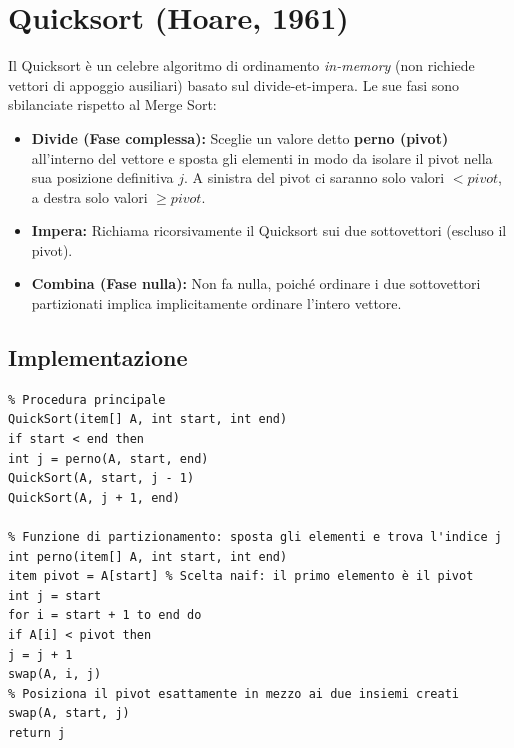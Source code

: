 \documentclass[12pt, a4paper]{article}
\begin{document}
\newpage

\section{Quicksort (Hoare, 1961)}

Il Quicksort è un celebre algoritmo di ordinamento \textit{in-memory} (non richiede vettori di appoggio ausiliari) basato sul divide-et-impera. Le sue fasi sono sbilanciate rispetto al Merge Sort:
\begin{itemize}
\item \textbf{Divide (Fase complessa):} Sceglie un valore detto \textbf{perno (pivot)} all'interno del vettore e sposta gli elementi in modo da isolare il pivot nella sua posizione definitiva $j$. A sinistra del pivot ci saranno solo valori $< pivot$, a destra solo valori $\ge pivot$.
\item \textbf{Impera:} Richiama ricorsivamente il Quicksort sui due sottovettori (escluso il pivot).
\item \textbf{Combina (Fase nulla):} Non fa nulla, poiché ordinare i due sottovettori partizionati implica implicitamente ordinare l'intero vettore.
\end{itemize}

\subsection{Implementazione}
\begin{verbatim}
% Procedura principale
QuickSort(item[] A, int start, int end)
if start < end then
int j = perno(A, start, end)
QuickSort(A, start, j - 1)
QuickSort(A, j + 1, end)

% Funzione di partizionamento: sposta gli elementi e trova l'indice j
int perno(item[] A, int start, int end)
item pivot = A[start] % Scelta naif: il primo elemento è il pivot
int j = start
for i = start + 1 to end do
if A[i] < pivot then
j = j + 1
swap(A, i, j)
% Posiziona il pivot esattamente in mezzo ai due insiemi creati
swap(A, start, j)
return j
\end{verbatim}
\end{document}
